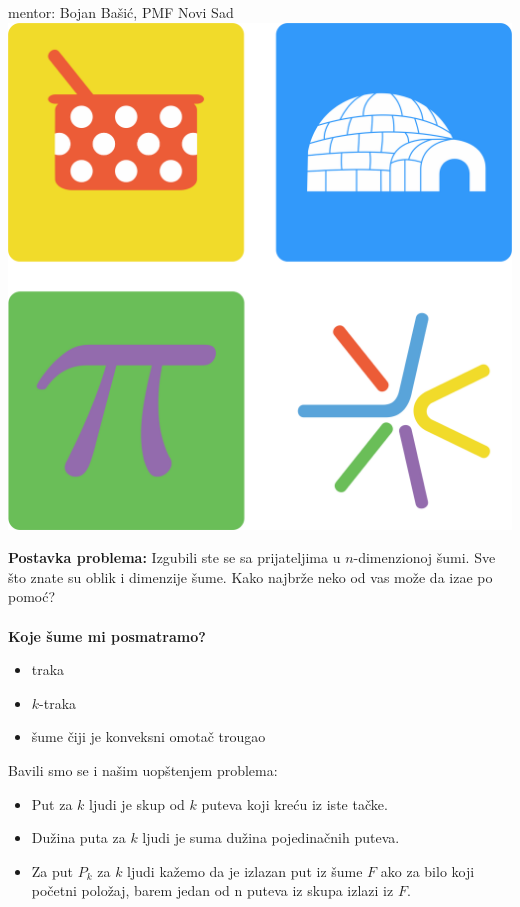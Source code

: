 \documentclass[b1paper,portrait]{template/baposter}
\begin{document}
\begin{poster}
{{		   	mentor: Bojan Ba\v si\' c, PMF Novi Sad
		}
}
{\includegraphics[scale=0.25]{MatLogo}}




{ 
	\textbf{Postavka problema:}
 	Izgubili ste se sa prijateljima u $n$-dimenzionoj \v sumi.
 	Sve \v sto znate su oblik i dimenzije \v sume.
 	Kako najbr\v ze neko od vas mo\v ze da iza\dj e po pomo\' c?
 	\\
 	\\
 	\textbf{Koje \v sume mi posmatramo?}
 	\begin{itemize}
 		\item traka
 		\item $k$-traka
 		\item \v sume \v ciji je konveksni omota\v c trougao
 	\end{itemize}
Bavili smo se i na\v sim uop\v stenjem problema:
	\begin{itemize}
		\item Put za $k$ ljudi je skup od $k$ puteva koji kre\' cu iz iste ta\v cke.
		\item Du\v zina puta za $k$ ljudi je suma du\v zina pojedina\v cnih puteva.
		\item Za put $P_k$ za $k$ ljudi ka\v zemo da je izlazan put iz \v sume $F$ ako za bilo koji po\v cetni polo\v zaj, barem jedan od n puteva iz skupa izlazi iz $F$.
	\end{itemize}
   	\vspace{0.15cm}
}


\end{poster}
\end{document}
